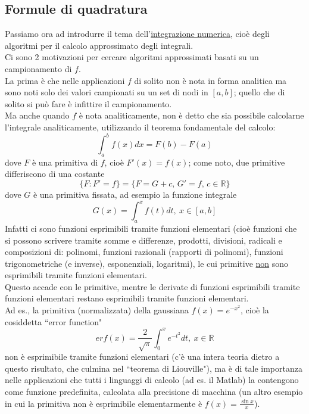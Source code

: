 \documentclass[12pt,a4paper]{article}
\begin{document}
\subsection{Formule di quadratura}
Passiamo ora ad introdurre il tema dell'\uline{integrazione numerica}, cioè degli algoritmi per il calcolo approssimato degli integrali.\\Ci sono 2 motivazioni per cercare algoritmi approssimati basati su un campionamento di $f$.\\La prima è che nelle applicazioni $f$ di solito non è nota in forma analitica ma sono noti solo dei valori campionati su un set di nodi in $[a,b]$; quello che di solito si può fare è infittire il campionamento.\\
Ma anche quando $f$ è nota analiticamente, non è detto che sia possibile calcolarne l'integrale analiticamente, utilizzando il teorema fondamentale del calcolo:
\begin{equation*}
    \int_a^b f(x)dx=F(b)-F(a)
\end{equation*}
dove $F$ è una primitiva di $f$, cioè $F'(x)=f(x)$; come noto, due primitive differiscono di una costante
\begin{equation*}
    \{F:F'=f\}=\{F=G+c,\,G'=f,\,c\in\mathbb{R}\}
\end{equation*}
dove $G$ è una primitiva fissata, ad esempio la funzione integrale
\begin{equation*}
    G(x) = \int_{a}^{x} f(t) dt, \ x \in [a,b]
\end{equation*}
Infatti ci sono funzioni esprimibili tramite funzioni elementari (cioè funzioni che si possono scrivere tramite somme e differenze, prodotti, divisioni, radicali e composizioni di: polinomi, funzioni razionali (rapporti di polinomi), funzioni trigonometriche (e inverse), esponenziali, logaritmi), le cui primitive \uline{non} sono esprimibili tramite funzioni elementari. \\
Questo accade con le primitive, mentre le derivate di funzioni esprimibili tramite funzioni elementari restano esprimibili tramite funzioni elementari. \\
Ad es., la primitiva (normalizzata) della gaussiana $f(x) = e^{-x^2}$, cioè la cosiddetta ``error function"
\begin{equation*}
    erf(x) = \frac{2}{\sqrt{\pi}} \int_0^x e^{-t^2} dt, \ x \in \mathbb{R}
\end{equation*}
non è esprimibile tramite funzioni elementari (c'è una intera teoria dietro a questo risultato, che culmina nel ``teorema di Liouville"), ma è di tale importanza nelle applicazioni che tutti i linguaggi di calcolo (ad es. il Matlab) la contengono come funzione predefinita, calcolata alla precisione di macchina (un altro esempio in cui la primitiva non è esprimibile elementarmente è $f(x) = \frac{\sin{x}}{x}$).\\
\end{document}
